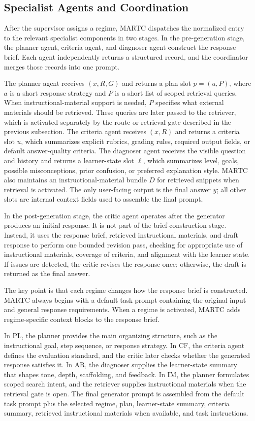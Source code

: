 \documentclass[letterpaper, 10 pt, conference]{ieeeconf}
\begin{document}
\subsection{Specialist Agents and Coordination}
After the supervisor assigns a regime, MARTC dispatches the normalized entry to the relevant specialist components in two stages. In the pre-generation stage, the planner agent, criteria agent, and diagnoser agent construct the response brief. Each agent independently returns a structured record, and the coordinator merges those records into one prompt.

The planner agent receives $(x,R,G)$ and returns a plan slot $p=(a,P)$, where $a$ is a short response strategy and $P$ is a short list of scoped retrieval queries. When instructional-material support is needed, $P$ specifies what external materials should be retrieved. These queries are later passed to the retriever, which is activated separately by the route or retrieval gate described in the previous subsection. The criteria agent receives $(x,R)$ and returns a criteria slot $u$, which summarizes explicit rubrics, grading rules, required output fields, or default answer-quality criteria. The diagnoser agent receives the visible question and history and returns a learner-state slot $\ell$, which summarizes level, goals, possible misconceptions, prior confusion, or preferred explanation style. MARTC also maintains an instructional-material bundle $D$ for retrieved snippets when retrieval is activated. The only user-facing output is the final answer $y$; all other slots are internal context fields used to assemble the final prompt.

In the post-generation stage, the critic agent operates after the generator produces an initial response. It is not part of the brief-construction stage. Instead, it uses the response brief, retrieved instructional materials, and draft response to perform one bounded revision pass, checking for appropriate use of instructional materials, coverage of criteria, and alignment with the learner state. If issues are detected, the critic revises the response once; otherwise, the draft is returned as the final answer.

The key point is that each regime changes how the response brief is constructed. MARTC always begins with a default task prompt containing the original input and general response requirements. When a regime is activated, MARTC adds regime-specific context blocks to the response brief.

In PL, the planner provides the main organizing structure, such as the instructional goal, step sequence, or response strategy. In CF, the criteria agent defines the evaluation standard, and the critic later checks whether the generated response satisfies it. In AR, the diagnoser supplies the learner-state summary that shapes tone, depth, scaffolding, and feedback. In IM, the planner formulates scoped search intent, and the retriever supplies instructional materials when the retrieval gate is open. The final generator prompt is assembled from the default task prompt plus the selected regime, plan, learner-state summary, criteria summary, retrieved instructional materials when available, and task instructions.
\end{document}
